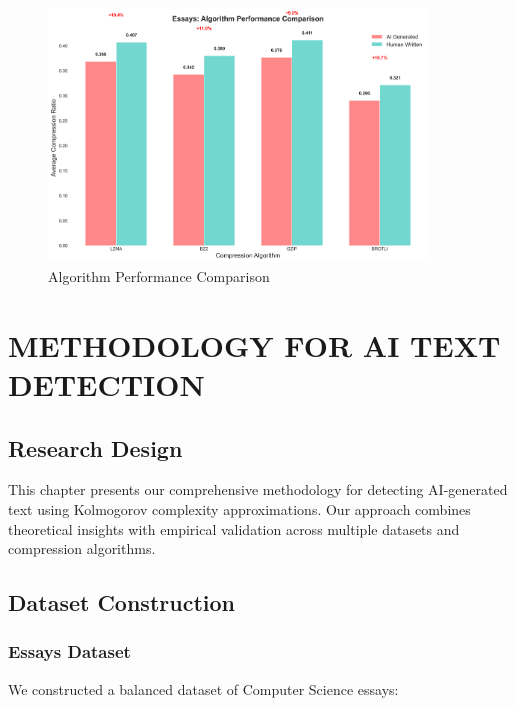 \documentclass[12pt,a4paper]{report}
\begin{document}
\begin{figure}[h]
\centering
\includegraphics[width=0.9\textwidth]{figures/essays_visualizations/03_algorithm_performance.png}
\caption{Algorithm Performance Comparison}
\label{fig:algorithm_performance}
\end{figure}

\chapter{METHODOLOGY FOR AI TEXT DETECTION}

\section{Research Design}

This chapter presents our comprehensive methodology for detecting AI-generated text using Kolmogorov complexity approximations. Our approach combines theoretical insights with empirical validation across multiple datasets and compression algorithms.

\section{Dataset Construction}

\subsection{Essays Dataset}

We constructed a balanced dataset of Computer Science essays:
\end{document}
